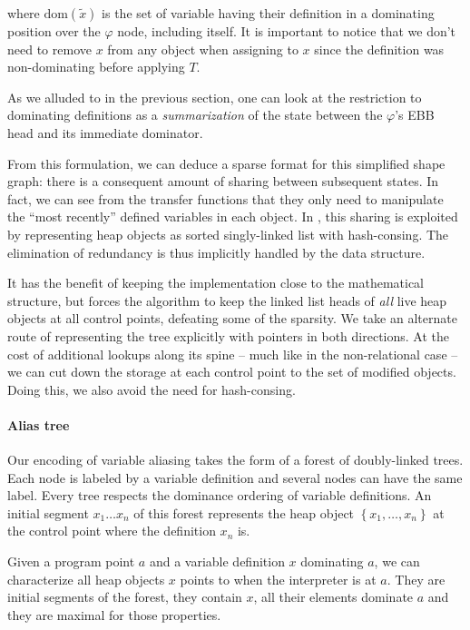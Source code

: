 \documentclass[11pt]{article}
\renewcommand{\phi}{\varphi}
\begin{document}
where $\text{dom}(\tilde{x})$ is the set of variable having their definition in a dominating position over the $\phi$ node, including itself. It is important to notice that we don't need to remove $x$ from any object when assigning to $x$ since the definition was non-dominating before applying $T$.

As we alluded to in the previous section, one can look at the restriction to dominating definitions as a \emph{summarization} of the state between the $\phi$'s EBB head and its immediate dominator.

From this formulation, we can deduce a sparse format for this simplified shape graph: there is a consequent amount of sharing between subsequent states. In fact, we can see from the transfer functions that they only need to manipulate the ``most recently'' defined variables in each object.
In \cite{ssa-alias}, this sharing is exploited by representing heap objects as sorted singly-linked list with hash-consing. The elimination of redundancy is thus implicitly handled by the data structure.

It has the benefit of keeping the implementation close to the mathematical structure, but forces the algorithm to keep the linked list heads of \emph{all} live heap objects at all control points, defeating some of the sparsity.
We take an alternate route of representing the tree explicitly with pointers in both directions. At the cost of additional lookups along its spine -- much like in the non-relational case -- we can cut down the storage at each control point to the set of modified objects. Doing this, we also avoid the need for hash-consing.

\paragraph{Alias tree} Our encoding of variable aliasing takes the form of a forest of doubly-linked trees.
Each node is labeled by a variable definition and several nodes can have the same label.
Every tree respects the dominance ordering of variable definitions.
An initial segment $x_1\dots x_n$ of this forest represents the heap object $\left\{x_1,\dots,x_n\right\}$ at the control point where the definition $x_n$ is.

Given a program point $a$ and a variable definition $x$ dominating $a$, we can characterize all heap objects $x$ points to when the interpreter is at $a$. They are initial segments of the forest, they contain $x$, all their elements dominate $a$ and they are maximal for those properties.
\end{document}
